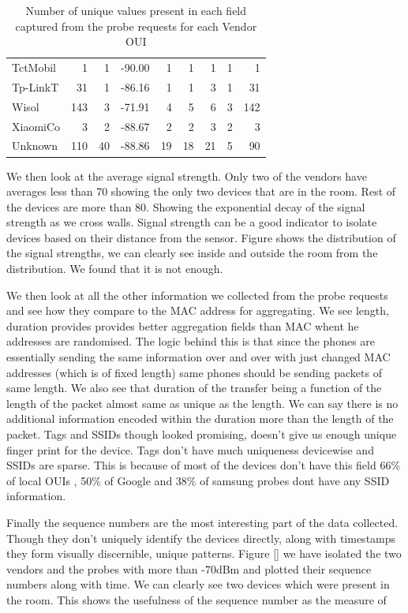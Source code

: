 \begin{table}
\begin{center}
\begin{tabular}{lrrrrrrrr}
  TctMobil &    1 &   1 & -90.00 &   1 &   1 &   1 &   1 &   1 \\ 
  Tp-LinkT &   31 &   1 & -86.16 &   1 &   1 &   3 &   1 &  31 \\ 
  Wisol    &  143 &   3 & -71.91 &   4 &   5 &   6 &   3 & 142 \\ 
  XiaomiCo &    3 &   2 & -88.67 &   2 &   2 &   3 &   2 &   3 \\ 
  Unknown  &  110 &  40 & -88.86 &  19 &  18 &  21 &   5 &  90 \\ 
  \bottomrule
  \end{tabular}
\end{center}
\caption{Number of unique values present in each field captured from the probe requests for each Vendor OUI}
\label{table:collection:proberequest}
\end{table}

We then look at the average signal strength.
Only two of the vendors have averages less than 70 showing the only two devices that are in the room.
Rest of the devices are more than 80. Showing the exponential decay of the signal strength as we cross walls.
Signal strength can be a good indicator to isolate devices based on their distance from the sensor.
Figure shows the distribution of the signal strengths, we can clearly see inside and outside the room from the distribution.
We found that it is not enough.

We then look at all the other information we collected from the probe requests and see how they compare to the MAC address for aggregating.
We see length, duration provides provides better aggregation fields than MAC whent he addresses are randomised.
The logic behind this is that since the phones are essentially sending the same information over and over with just changed MAC addresses (which is of fixed length) same phones should be sending packets of same length.
We also see that duration of the transfer being a function of the length of the packet almost same as unique as the length.
We can say there is no additional information encoded within the duration more than the length of the packet.
Tags and SSIDs though looked promising, doesn't give us enough unique finger print for the device.
Tags don't have much uniqueness devicewise and SSIDs are sparse.
This is because of most of the devices don't have this field 66\% of local OUIs , 50\% of Google and 38\% of samsung probes dont have any SSID information.

Finally the sequence numbers are the most interesting part of the data collected. Though they don't uniquely identify the devices directly, along with timestamps they form visually discernible, unique patterns.
Figure \ref{} we have isolated the two vendors and the probes with more than -70dBm and plotted their sequence numbers along with time. We can clearly see two devices which were present in the room. This shows the usefulness of the sequence number as the measure of 

